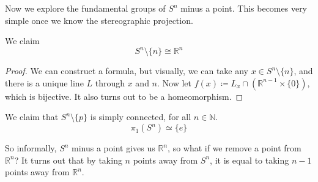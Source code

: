   Now we explore the fundamental groups of $S^n$ minus a point. This becomes very simple once we know the stereographic projection. 

  \begin{theorem}
    We claim 
    \begin{equation}
      S^n \setminus \{n\} \cong \mathbb{R}^{n}
    \end{equation}
  \end{theorem}
  \begin{proof}
    We can construct a formula, but visually, we can take any $x \in S^n \setminus \{n\}$, and there is a unique line $L$ through $x$ and $n$. Now let $f(x) \coloneqq L _x \cap (\mathbb{R}^{n-1} \times \{0\})$, which is bijective. It also turns out to be a homeomorphism. 
  \end{proof}

  \begin{corollary}
    We claim that $S^n \setminus \{p\}$ is simply connected, for all $n \in \mathbb{N}$. 
    \begin{equation}
      \pi_1 (S^n) \simeq \{e\}
    \end{equation}
  \end{corollary}

  So informally, $S^n$ minus a point gives us $\mathbb{R}^n$, so what if we remove a point from $\mathbb{R}^n$? It turns out that by taking $n$ points away from $S^n$, it is equal to taking $n-1$ points away from $\mathbb{R}^n$. 

